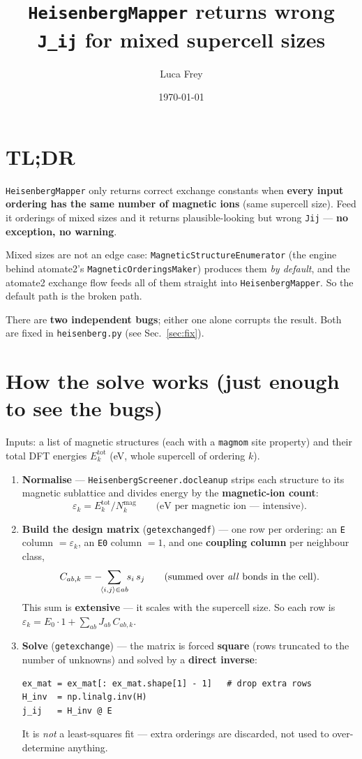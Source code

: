 \documentclass[11pt]{article}
\title{\texttt{HeisenbergMapper} returns wrong \texttt{J\_ij} for mixed
supercell sizes}
\author{Luca Frey}
\date{\today}
\newcommand{\code}[1]{\texttt{\def\_{\textunderscore\allowbreak}#1}}
\begin{document}
\maketitle

\section*{TL;DR}

\code{HeisenbergMapper} only returns correct exchange constants when
\textbf{every input ordering has the same number of magnetic ions} (same
supercell size). Feed it orderings of mixed sizes and it returns
plausible-looking but wrong \code{J\_ij} --- \textbf{no exception, no warning}.

Mixed sizes are not an edge case: \code{MagneticStructureEnumerator} (the engine
behind atomate2's \code{MagneticOrderingsMaker}) produces them \emph{by default},
and the atomate2 exchange flow feeds all of them straight into
\code{HeisenbergMapper}. So the default path is the broken path.

There are \textbf{two independent bugs}; either one alone corrupts the result.
Both are fixed in \code{heisenberg.py} (see Sec.~\ref{sec:fix}).

\section{How the solve works (just enough to see the bugs)}
\label{sec:how}

Inputs: a list of magnetic structures (each with a \code{magmom} site property)
and their total DFT energies $E_k^{\mathrm{tot}}$ (eV, whole supercell of ordering
$k$).

\begin{enumerate}
\item \textbf{Normalise} --- \code{HeisenbergScreener.\_do\_cleanup} strips each
structure to its magnetic sublattice and divides energy by the
\textbf{magnetic-ion count}:
\[
  \varepsilon_k = E_k^{\mathrm{tot}} / N_k^{\mathrm{mag}}
  \qquad\text{(eV per magnetic ion --- intensive).}
\]

\item \textbf{Build the design matrix} (\code{\_get\_exchange\_df}) --- one row
per ordering: an \code{E} column $=\varepsilon_k$, an \code{E0} column $=1$, and
one \textbf{coupling column} per neighbour class,
\[
  C_{ab,k} = -\!\!\sum_{\langle i,j\rangle\in ab}\!\! s_i\,s_j
  \qquad\text{(summed over \emph{all} bonds in the cell).}
\]
This sum is \textbf{extensive} --- it scales with the supercell size. So each row
is $\varepsilon_k = E_0\cdot 1 + \sum_{ab} J_{ab}\,C_{ab,k}$.

\item \textbf{Solve} (\code{get\_exchange}) --- the matrix is forced
\textbf{square} (rows truncated to the number of unknowns) and solved by a
\textbf{direct inverse}:
\begin{lstlisting}
ex_mat = ex_mat[: ex_mat.shape[1] - 1]   # drop extra rows
H_inv  = np.linalg.inv(H)
j_ij   = H_inv @ E
\end{lstlisting}
It is \emph{not} a least-squares fit --- extra orderings are discarded, not used
to over-determine anything.
\end{enumerate}
\end{document}
